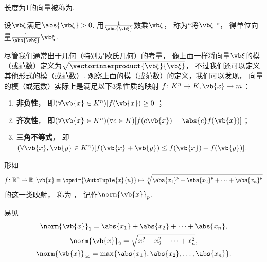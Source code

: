 \begin{definition}
长度为1的向量被称为.
\end{definition}

\begin{definition}
\def\f{\frac{1}{\abs{\a}}}
设\(\a\)满足\(\abs{\a}>0\).
用\(\f\)数乘\(\a\)，
称为“将\(\a\) ”，
得单位向量\(\f\a\).
\end{definition}

尽管我们通常出于几何（特别是欧氏几何）的考量，
像上面一样将向量\(\a\)的模（或范数）定义为\(\sqrt{\vectorinnerproduct{\a}{\a}}\)，
不过我们还可以定义其他形式的模（或范数）.
观察上面的模（或范数）的定义，我们可以发现，
向量的模（或范数）实际上是满足以下3条性质的映射
\begingroup%
\def\x{\vb{x}}%
\def\y{\vb{y}}%
\(f\colon K^n \to K, \x \mapsto m\)：
\begin{enumerate}
	\item {\bf 非负性}，
	即\((\forall \x \in K^n)[f(\x) \geq 0]\)；
	\item {\bf 齐次性}，
	即\((\forall \x \in K^n)(\forall c \in K)[f(c \x) = \abs{c} f(\x)]\)；
	\item {\bf 三角不等式}，
	即\((\forall \x,\y \in K^n)[f(\x+\y) \leq f(\x) + f(\y)]\).
\end{enumerate}

\begin{definition}\label{definition:向量与矩阵.p范数}
形如\[
	f\colon\mathbb{R}^n \to \mathbb{R},
	\x = \opair{\AutoTuple{x}{n}}
	\mapsto
	\sqrt[p]{\abs{x_1}^p + \abs{x_2}^p + \dotsb + \abs{x_n}^p}
\]的这一类映射，
称为 ，
记作\(\norm{\x}_p\).
\end{definition}

易见
\begin{gather}
	\norm{\x}_1 = \abs{x_1} + \abs{x_2} + \dotsb + \abs{x_n}, \\
	\norm{\x}_2 = \sqrt{x_1^2 + x_2^2 + \dotsb + x_n^2}, \\
	\norm{\x}_\infty = \max\{\abs{x_1},\abs{x_2},\dotsc,\abs{x_n}\}.
\end{gather}
\endgroup%
